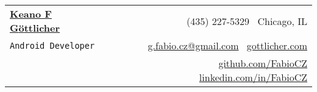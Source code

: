\documentclass[letterpaper,11pt]{article}
\begin{document}
\newcommand{\mywebheader}{
\begin{tabular*}{7in}{l@{\extracolsep{\fill}}r}
	\textbf{\href{http://www.gottlicher.com/}{\LARGE Keano F G{\" o}ttlicher}} & \faPhone \ (435) 227-5329 \faHome \ Chicago, IL\\
	{\footnotesize \texttt{{Android Developer}}} & \faEnvelope \ \href{mailto:g.fabio.cz@gmail.com}{g.fabio.cz@gmail.com} \faGlobe \  \href{http://www.gottlicher.com}{gottlicher.com}\\
	  & \faGithub \  \href{http://www.github.com/FabioCZ}{github.com/FabioCZ} \faLinkedin \  \href{http://www.linkedin.com/in/FabioCZ}{linkedin.com/in/FabioCZ}
	\end{tabular*}
\\
\vspace{0.1in}}
\newcommand{\CS}{C\nolinebreak\hspace{-.05em}\raisebox{.6ex}{\tiny\bf \#}}

\mywebheader
\end{document}
